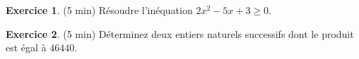 \documentclass{exam}
\theoremstyle{definition}
\newtheorem{exercice}{Exercice}
\begin{document}
\large


% 
% 


\begin{exercice}{(5 min)}
    Résoudre l'inéquation $2x^2 -5x + 3 \geq 0$.%
\end{exercice}

\begin{exercice}{(5 min)}
    Déterminez deux entiers naturels successifs dont le produit est égal à $46440$.
\end{exercice}

\end{document}
